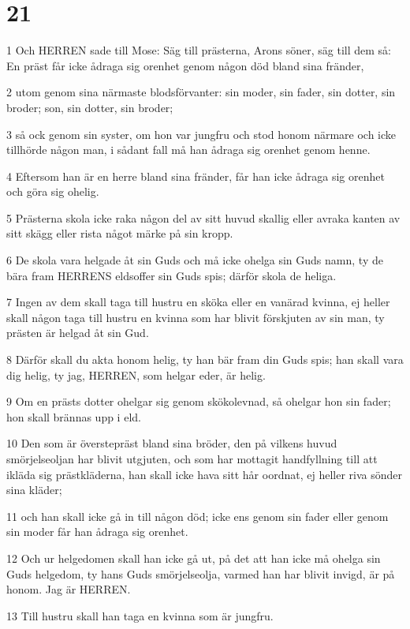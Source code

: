 \chapter{21}

\par 1 Och HERREN sade till Mose: Säg till prästerna, Arons söner, säg till dem så: En präst får icke ådraga sig orenhet genom någon död bland sina fränder,
\par 2 utom genom sina närmaste blodsförvanter: sin moder, sin fader, sin dotter, sin broder; son, sin dotter, sin broder;
\par 3 så ock genom sin syster, om hon var jungfru och stod honom närmare och icke tillhörde någon man, i sådant fall må han ådraga sig orenhet genom henne.
\par 4 Eftersom han är en herre bland sina fränder, får han icke ådraga sig orenhet och göra sig ohelig.
\par 5 Prästerna skola icke raka någon del av sitt huvud skallig eller avraka kanten av sitt skägg eller rista något märke på sin kropp.
\par 6 De skola vara helgade åt sin Guds och må icke ohelga sin Guds namn, ty de bära fram HERRENS eldsoffer sin Guds spis; därför skola de heliga.
\par 7 Ingen av dem skall taga till hustru en sköka eller en vanärad kvinna, ej heller skall någon taga till hustru en kvinna som har blivit förskjuten av sin man, ty prästen är helgad åt sin Gud.
\par 8 Därför skall du akta honom helig, ty han bär fram din Guds spis; han skall vara dig helig, ty jag, HERREN, som helgar eder, är helig.
\par 9 Om en prästs dotter ohelgar sig genom skökolevnad, så ohelgar hon sin fader; hon skall brännas upp i eld.
\par 10 Den som är överstepräst bland sina bröder, den på vilkens huvud smörjelseoljan har blivit utgjuten, och som har mottagit handfyllning till att ikläda sig prästkläderna, han skall icke hava sitt hår oordnat, ej heller riva sönder sina kläder;
\par 11 och han skall icke gå in till någon död; icke ens genom sin fader eller genom sin moder får han ådraga sig orenhet.
\par 12 Och ur helgedomen skall han icke gå ut, på det att han icke må ohelga sin Guds helgedom, ty hans Guds smörjelseolja, varmed han har blivit invigd, är på honom. Jag är HERREN.
\par 13 Till hustru skall han taga en kvinna som är jungfru.
